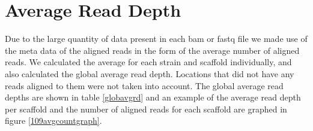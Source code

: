\documentclass[12pt]{article}
\begin{document}
\section{Average Read Depth}
\vspace{-0.5cm}
	Due to the large quantity of data present in each bam or fastq file we made use of the meta data of the aligned reads in the form of the average number of aligned reads. We calculated the average for each strain and scaffold individually, and also calculated the global average read depth. Locations that did not have any reads aligned to them were not taken into account. The global average read depths are shown in table \ref{globavgrd} and an example of the average read depth per scaffold and the number of aligned reads for each scaffold are graphed in figure \ref{109avgcountgraph}.
\begin{table}[H]
	\begin{center}
		 \label{globavgrd}
		\vspace{0.5cm}
	\end{center}
\end{table}
\end{document}
